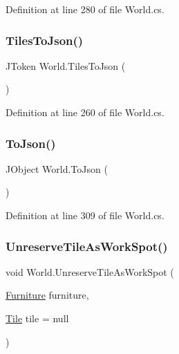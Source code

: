 Definition at line 280 of file World.\+cs.

\mbox{\label{class_world_a8b99f515191218dc39f810ef8e8cd78e}} 
\subsubsection{\texorpdfstring{Tiles\+To\+Json()}{TilesToJson()}}
{\footnotesize\ttfamily J\+Token World.\+Tiles\+To\+Json (\begin{DoxyParamCaption}{ }\end{DoxyParamCaption})}



Definition at line 260 of file World.\+cs.

\mbox{\label{class_world_aaccd8af7ffb248bdd1e741eb89afb60f}} 
\subsubsection{\texorpdfstring{To\+Json()}{ToJson()}}
{\footnotesize\ttfamily J\+Object World.\+To\+Json (\begin{DoxyParamCaption}{ }\end{DoxyParamCaption})}



Definition at line 309 of file World.\+cs.

\mbox{\label{class_world_a4ce845e2814d6da8d9d343ed355b02ac}} 
\subsubsection{\texorpdfstring{Unreserve\+Tile\+As\+Work\+Spot()}{UnreserveTileAsWorkSpot()}}
{\footnotesize\ttfamily void World.\+Unreserve\+Tile\+As\+Work\+Spot (\begin{DoxyParamCaption}\item[{\hyperlink{class_furniture}{Furniture}}]{furniture,  }\item[{\hyperlink{class_tile}{Tile}}]{tile = {\ttfamily null} }\end{DoxyParamCaption})}



